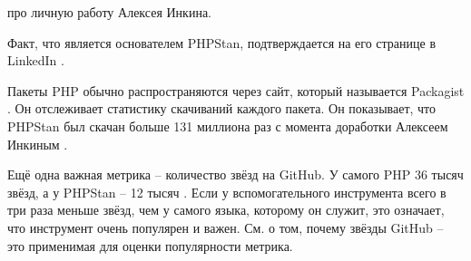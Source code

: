 
про личную работу Алексея Инкина.

Факт, что \MrMirtes является основателем PHPStan,
подтверждается на его странице в LinkedIn .



Пакеты PHP обычно распространяются через сайт, который называется Packagist .
Он отслеживает статистику скачиваний каждого пакета.
Он показывает, что PHPStan был скачан больше 131 миллиона раз
с момента доработки Алексеем Инкиным .

Ещё одна важная метрика -- количество звёзд на GitHub.
У самого PHP 36 тысяч звёзд, а у PHPStan -- 12 тысяч .
Если у вспомогательного инструмента всего в три раза меньше звёзд, чем у самого языка, которому он служит,
это означает, что инструмент очень популярен и важен.
См.  о том, почему звёзды GitHub -- это применимая для оценки популярности метрика.
